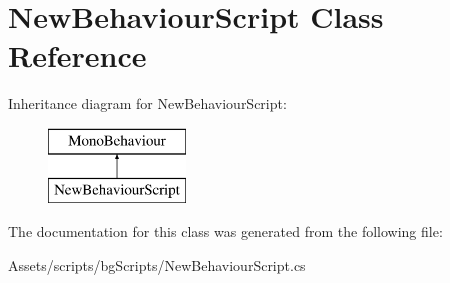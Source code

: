 \hypertarget{class_new_behaviour_script}{}\section{New\+Behaviour\+Script Class Reference}
\label{class_new_behaviour_script}
Inheritance diagram for New\+Behaviour\+Script\+:\begin{figure}[H]
\begin{center}
\leavevmode
\includegraphics[height=2.000000cm]{class_new_behaviour_script}
\end{center}
\end{figure}


The documentation for this class was generated from the following file\+:\begin{DoxyCompactItemize}
\item 
Assets/scripts/bg\+Scripts/New\+Behaviour\+Script.\+cs\end{DoxyCompactItemize}
